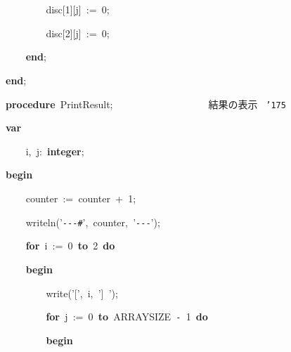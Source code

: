 \documentclass[a4paper,10pt]{article}
\def\mc{\relax}
\begin{document}
\noindent
\mbox{}{\tt\mc \ }{\tt\mc \ }{\tt\mc \ }{\tt\mc \ }{\tt\mc \ }{\tt\mc \ }{\tt\mc \ }{\tt\mc \ }disc[1][j]{\tt\mc \ }:={\tt\mc \ }0;

\noindent
\mbox{}{\tt\mc \ }{\tt\mc \ }{\tt\mc \ }{\tt\mc \ }{\tt\mc \ }{\tt\mc \ }{\tt\mc \ }{\tt\mc \ }disc[2][j]{\tt\mc \ }:={\tt\mc \ }0;

\noindent
\mbox{}{\tt\mc \ }{\tt\mc \ }{\tt\mc \ }{\tt\mc \ }\textbf{end};

\noindent
\mbox{}\textbf{end};

\noindent
\mbox{}\hfill

\noindent
\mbox{}\textbf{procedure}{\tt\mc \ }PrintResult;{\tt\mc \ }{\tt\mc \ }{\tt\mc \ }{\tt\mc \ }{\tt\mc \ }{\tt\mc \ }{\tt\mc \ }{\tt\mc \ }{\tt\mc \ }{\tt\mc \ }{\tt\mc \ }{\tt\mc \ }{\tt\mc \ }{\tt\mc \ }{\tt\mc \ }{\tt\mc \ }{\tt\mc \ }{\tt\mc \ }\rm\mc {\tt\char'173}\  結果の表示 \rm\mc \ {\tt\char'175}
\tt\mc 

\noindent
\mbox{}\textbf{var}

\noindent
\mbox{}{\tt\mc \ }{\tt\mc \ }{\tt\mc \ }{\tt\mc \ }i,{\tt\mc \ }j:{\tt\mc \ }\textbf{integer};

\noindent
\mbox{}\textbf{begin}

\noindent
\mbox{}{\tt\mc \ }{\tt\mc \ }{\tt\mc \ }{\tt\mc \ }counter{\tt\mc \ }:={\tt\mc \ }counter{\tt\mc \ }+{\tt\mc \ }1;

\noindent
\mbox{}{\tt\mc \ }{\tt\mc \ }{\tt\mc \ }{\tt\mc \ }writeln('{\tt -}{\tt -}{\tt -}{\tt\#}',{\tt\mc \ }counter,{\tt\mc \ }'{\tt -}{\tt -}{\tt -}');

\noindent
\mbox{}{\tt\mc \ }{\tt\mc \ }{\tt\mc \ }{\tt\mc \ }\textbf{for}{\tt\mc \ }i{\tt\mc \ }:={\tt\mc \ }0{\tt\mc \ }\textbf{to}{\tt\mc \ }2{\tt\mc \ }\textbf{do}

\noindent
\mbox{}{\tt\mc \ }{\tt\mc \ }{\tt\mc \ }{\tt\mc \ }\textbf{begin}

\noindent
\mbox{}{\tt\mc \ }{\tt\mc \ }{\tt\mc \ }{\tt\mc \ }{\tt\mc \ }{\tt\mc \ }{\tt\mc \ }{\tt\mc \ }write('[',{\tt\mc \ }i,{\tt\mc \ }']{\tt\mc \ }');

\noindent
\mbox{}{\tt\mc \ }{\tt\mc \ }{\tt\mc \ }{\tt\mc \ }{\tt\mc \ }{\tt\mc \ }{\tt\mc \ }{\tt\mc \ }\textbf{for}{\tt\mc \ }j{\tt\mc \ }:={\tt\mc \ }0{\tt\mc \ }\textbf{to}{\tt\mc \ }ARRAYSIZE{\tt\mc \ }{\tt -}{\tt\mc \ }1{\tt\mc \ }\textbf{do}

\noindent
\mbox{}{\tt\mc \ }{\tt\mc \ }{\tt\mc \ }{\tt\mc \ }{\tt\mc \ }{\tt\mc \ }{\tt\mc \ }{\tt\mc \ }\textbf{begin}
\end{document}
